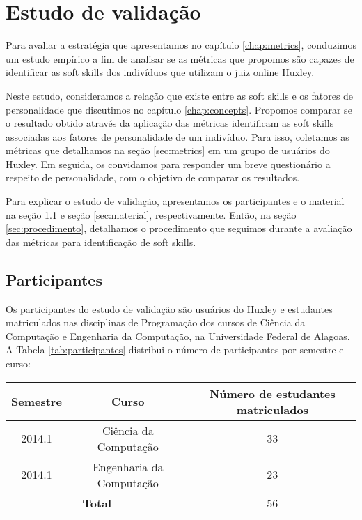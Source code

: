 

\chapter{Estudo de validação}

\label{chap:evaluation}

Para avaliar a estratégia que apresentamos no capítulo \ref{chap:metrics}, conduzimos um estudo empírico a fim de analisar se as métricas que propomos são capazes de identificar as soft skills dos indivíduos que utilizam o juiz online Huxley.

Neste estudo, consideramos a relação que existe entre as soft skills e os fatores de personalidade que discutimos no capítulo \ref{chap:concepts}. Propomos comparar se o resultado obtido através da aplicação das métricas identificam as soft skills associadas aos fatores de personalidade de um indivíduo. Para isso, coletamos as métricas que detalhamos na seção \ref{sec:metrics} em um grupo de usuários do Huxley. Em seguida, os convidamos para responder um breve questionário a respeito de personalidade, com o objetivo de comparar os resultados. 

Para explicar o estudo de validação, apresentamos os participantes e o material na seção \ref{sec:participantes} e seção \ref{sec:material}, respectivamente. Então, na seção \ref{sec:procedimento}, detalhamos o procedimento que seguimos durante a avaliação das métricas para identificação de soft skills.

\section{Participantes}
\label{sec:participantes}

Os participantes do estudo de validação são usuários do Huxley e estudantes matriculados nas disciplinas de Programação dos cursos de Ciência da Computação e Engenharia da Computação, na Universidade Federal de Alagoas. A Tabela \ref{tab:participantes} distribui o número de participantes por semestre e curso:

\begin{table*}[ht]
\footnotesize
\caption{\small Participantes}
\addtolength{\tabcolsep}{-3.5pt}
\renewcommand{\arraystretch}{1.4} 
\centering

\begin{tabular}{|c|c|c|}
\hline
\textbf{Semestre} & \textbf{Curso} 		& 	\textbf{Número de estudantes matriculados} \\ \hline
2014.1 & Ciência da Computação 		 		& 	33 		\\ \hline
2014.1 & Engenharia da Computação 		& 	23 		\\ \hline
\multicolumn{2}{|c|}{\textbf{Total}} 	&		56 		\\ \hline
\end{tabular}

\label{tab:participantes}
\end{table*}

